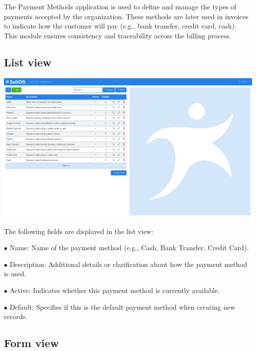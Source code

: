 \documentclass[a4paper]{article}
\begin{document}
The Payment Methods application is used to define and manage the types of payments accepted by the organization.
These methods are later used in invoices to indicate how the customer will pay (e.g., bank transfer, credit card, cash).
This module ensures consistency and traceability across the billing process.

\hypertarget{toc148}{}
\subsection{List view}

\begin{center}\includegraphics[width=1\textwidth]{../ujest/snaps/test-screenshots-js-screenshots-sales-payment-methods-list-en-us-1-snap.png}\end{center}

The following fields are displayed in the list view:

\begin{compactitem}
\item[\color{myblue}$\bullet$] Name: Name of the payment method (e.g., Cash, Bank Transfer, Credit Card).
\item[\color{myblue}$\bullet$] Description: Additional details or clarification about how the payment method is used.
\item[\color{myblue}$\bullet$] Active: Indicates whether this payment method is currently available.
\item[\color{myblue}$\bullet$] Default: Specifies if this is the default payment method when creating new records.
\end{compactitem}

\hypertarget{toc149}{}
\subsection{Form view}
\end{document}
